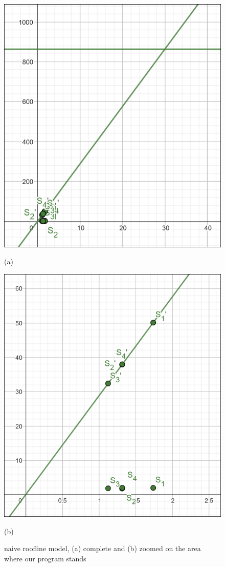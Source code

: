 \begin{figure}[h]
	\centering
	\includegraphics[width=\textwidth]{images/roofline-overview}
	\caption*{(a)}
	\endminipage\hfill
	\includegraphics[width=\textwidth]{images/roofline-zoom.png}
	\caption*{(b)}
	\endminipage\hfill
	\caption{\centering naive roofline model, (a) complete and (b) zoomed on the area where our program stands}\label{img:roofline-model}
\end{figure}

